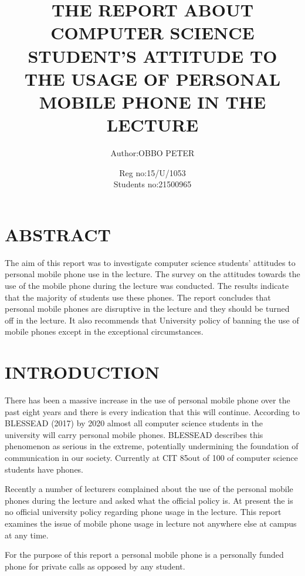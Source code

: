 \documentclass{article}
\begin{document}
	\title{THE REPORT ABOUT COMPUTER SCIENCE STUDENT’S ATTITUDE TO THE USAGE OF PERSONAL MOBILE PHONE IN THE LECTURE}
	\author{Author:OBBO PETER}
	\date{Reg no:15/U/1053 \\  Students no:21500965}
	
	
\maketitle

\tableofcontents

\section{ABSTRACT}\label{sec:into}

The aim of this report was to investigate computer science students’ attitudes to personal mobile phone use in the lecture. The survey on the attitudes towards the use of the mobile phone during the lecture was conducted. The results indicate that the majority of students use these phones. The report concludes that personal mobile phones are disruptive in the lecture and they should be turned off in the lecture. It also recommends that University policy of banning the use of mobile phones except in the exceptional circumstances. 

\section{INTRODUCTION}\label{sec:into}
There has been a massive increase in the use of personal mobile phone over the past eight years and there is every indication that this will continue. According to BLESSEAD (2017) by 2020 almost all computer science students in the university will carry personal mobile phones. BLESSEAD describes this phenomenon as serious in the extreme, potentially undermining the foundation of communication in our society. Currently at CIT 85out of 100 of computer science students have phones.


Recently a number of lecturers complained about the use of the personal mobile phones during the lecture and asked what the official policy is. At present the is no official university policy regarding phone usage in the lecture. This report examines the issue of mobile phone usage in lecture not anywhere else at campus at any time.


For the purpose of this report a personal mobile phone is a personally funded phone for private calls as opposed by any student.
\end{document}
